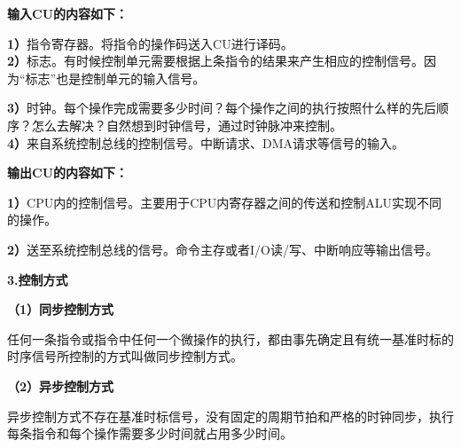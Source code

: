 \textbf{输入CU的内容如下：}

\textbf{1）}指令寄存器。将指令的操作码送入CU进行译码。\\

\textbf{2）}标志。有时候控制单元需要根据上条指令的结果来产生相应的控制信号。因为``标志''也是控制单元的输入信号。

\textbf{3）}时钟。每个操作完成需要多少时间？每个操作之间的执行按照什么样的先后顺序？怎么去解决？自然想到时钟信号，通过时钟脉冲来控制。\\

\textbf{4）}来自系统控制总线的控制信号。中断请求、DMA请求等信号的输入。

\textbf{输出CU的内容如下：}

\textbf{1）}CPU内的控制信号。主要用于CPU内寄存器之间的传送和控制ALU实现不同的操作。

\textbf{2）}送至系统控制总线的信号。命令主存或者I/O读/写、中断响应等输出信号。

{\textbf{3.控制方式}}

\textbf{（1）同步控制方式}

任何一条指令或指令中任何一个微操作的执行，都由事先确定且有统一基准时标的时序信号所控制的方式叫做同步控制方式。

\textbf{（2）异步控制方式}

异步控制方式不存在基准时标信号，没有固定的周期节拍和严格的时钟同步，执行每条指令和每个操作需要多少时间就占用多少时间。\\
